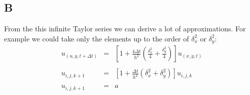 \documentclass[11pt, a4paper]{article}
\begin{document}
\subsection{B}
From the this infinite Taylor series we can derive a lot of approximations. For example we could take only the elements up to the order of $\delta_x^2$ or $\delta_y^2$: 
\begin{equation}
    \begin{array}{rcl}
        \displaystyle u_{\left(u,y,t+\Delta t\right)} & = & \displaystyle \left[1+\frac{4\Delta t}{h^2}\left(\frac{\delta_x^2}{4}+\frac{\delta_y^2}{4}\right)\right]u_{\left(x,y,t\right)} \\\\
        \displaystyle u_{i,j,k+1} & = & \displaystyle \left[1+\frac{\Delta t}{h^2}\left(\delta_x^2+\delta^2_y\right)\right]u_{i,j,k} \\\\
        \displaystyle u_{i,j,k+1} & = & a
    \end{array}
\end{equation}
\end{document}
